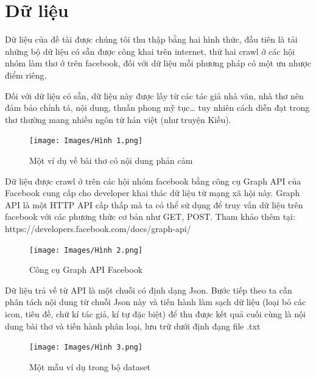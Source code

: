 \documentclass[a4paper]{article}
\theoremstyle{definition}
\begin{document}
\section{Dữ liệu}
Dữ liệu của đề tài được chúng tôi thu thập bằng hai hình thức, đầu tiên là tải những bộ dữ liệu có sẵn được công khai trên internet, thứ hai crawl ở các hội nhóm làm thơ ở trên facebook, đối với dữ liệu mỗi phương pháp có một ưu nhược điểm riêng. 

Đối với dữ liệu có sẵn, dữ liệu này được lấy từ các tác giả nhà văn, nhà thơ nên đảm bảo chính tả, nội dung, thuần phong mỹ tục… tuy nhiên cách diễn đạt trong thơ thường mang nhiều ngôn từ hán việt (như truyện Kiều). 
\begin{figure}[h!]
\begin{center}
\texttt{[image: Images/Hình 1.png]} \\[0.2in]

\caption{Một ví dụ về bài thơ có nội dung phản cảm}
\end{center}
\end{figure}

Dữ liệu được crawl ở trên các hội nhóm facebook bằng công cụ Graph API của Facebook cung cấp cho developer khai thác dữ liệu từ mạng xã hội này. Graph API là một HTTP API cấp thấp mà ta có thể sử dụng để truy vấn dữ liệu trên facebook với các phương thức cơ bản như GET, POST. Tham khảo thêm tại: https://developers.facebook.com/docs/graph-api/
\begin{figure}[h!]
\begin{center}
\texttt{[image: Images/Hình 2.png]} \\[0.2in]

\caption{Công cụ Graph API Facebook}
\end{center}
\end{figure}

Dữ liệu trả về từ API là một chuỗi có định dạng Json. Bước tiếp theo ta cần phân tách nội dung từ chuỗi Json này và tiến hành làm sạch dữ liệu (loại bỏ các icon, tiêu đề, chữ kí tác giả, kí tự đặc biệt) để thu được kết quả cuối cùng là nội dung bài thơ và tiến hành phân loại, lưu trữ dưới định đạng file .txt
\begin{figure}[h!]
\begin{center}
\texttt{[image: Images/Hình 3.png]} \\[0.2in]

\caption{Một mẫu ví dụ trong bộ dataset}
\end{center}
\end{figure}
\end{document}
